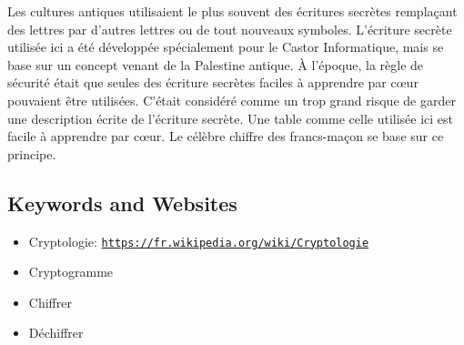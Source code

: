 \documentclass[a4paper,11pt]{report}
\newcommand{\BrochureUrlText}[1]{\texttt{#1}}
\begin{document}
Les cultures antiques utilisaient le plus souvent des écritures secrètes remplaçant des lettres par d’autres lettres ou de tout nouveaux symboles. L’écriture secrète utilisée ici a été développée spécialement pour le Castor Informatique, mais se base sur un concept venant de la Palestine antique. À l’époque, la règle de sécurité était que seules des écriture secrètes faciles à apprendre par cœur pouvaient être utilisées. C’était considéré comme un trop grand risque de garder une description écrite de l’écriture secrète. Une table comme celle utilisée ici est facile à apprendre par cœur. Le célèbre chiffre des francs-maçon se base sur ce principe.

{\raggedright

\subsection*{Keywords and Websites}

\begin{itemize}
  \item Cryptologie: \href{https://fr.wikipedia.org/wiki/Cryptologie}{\BrochureUrlText{https://fr.wikipedia.org/wiki/Cryptologie}}
  \item Cryptogramme
  \item Chiffrer
  \item Déchiffrer
\end{itemize}


}
\end{document}

